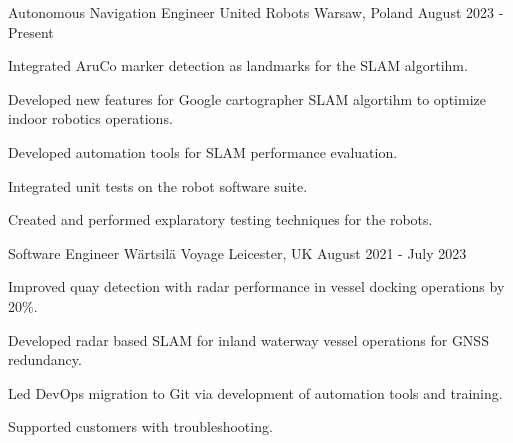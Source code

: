 

\begin{cventries}

  \cventry
    {Autonomous Navigation Engineer} %
    {United Robots} %
    {Warsaw, Poland} %
    {August 2023 - Present} %
    {
      \begin{cvitems} %
        \item {Integrated AruCo marker detection as landmarks for the SLAM algortihm.}
        \item {Developed new features for Google cartographer SLAM algortihm to optimize indoor robotics operations.}
        \item {Developed automation tools for SLAM performance evaluation.}
        \item {Integrated unit tests on the robot software suite.}
        \item {Created and performed explaratory testing techniques for the robots.}
      \end{cvitems}
    }
    \newline
    \newline
  \cventry
    {Software Engineer} %
    {Wärtsilä Voyage} %
    {Leicester, UK} %
    {August 2021 - July 2023} %
    {
      \begin{cvitems} %
        \item {Improved quay detection with radar performance in vessel docking operations by 20\%.}
        \item {Developed radar based SLAM for inland waterway vessel operations for GNSS redundancy.}
        \item {Led DevOps migration to Git via development of automation tools and training.}
        \item {Supported customers with troubleshooting.}
      \end{cvitems}
    }
    \newline

\end{cventries}
